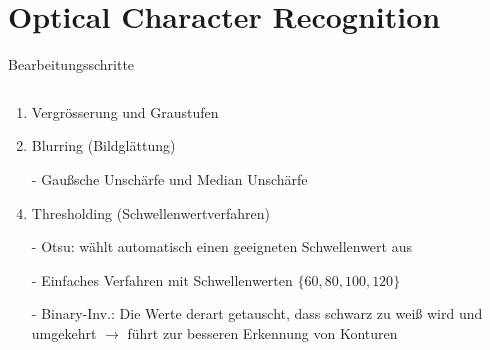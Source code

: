 \section{Optical Character Recognition}

\begin{frame}{Bearbeitungsschritte}
\begin{columns}
\begin{column}{0.6\textwidth}
\begin{enumerate}
\item {\small Vergr\"osserung und Graustufen}
\item {\small Blurring (Bildgl\"attung)}
\item[-] {\scriptsize Gaußsche Unsch\"arfe und Median Unsch\"arfe}
\item {\small Thresholding (Schwellenwertverfahren)}

\item[-] {\scriptsize Otsu: w\"ahlt automatisch einen geeigneten Schwellenwert aus}
\item[-] {\scriptsize Einfaches Verfahren mit Schwellenwerten $\{60,80,100,120\}$}
\item[-] {\scriptsize Binary-Inv.: Die Werte derart getauscht, dass schwarz zu weiß wird und umgekehrt $\rightarrow$ führt zur besseren Erkennung von Konturen}


\end{enumerate}
\end{column}
\end{columns}
\end{frame}
